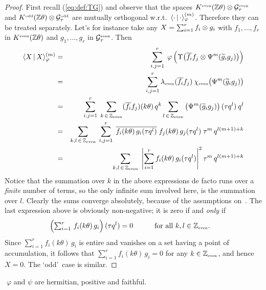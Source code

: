 \begin{proof}
First recall (\ref{eq:def:TG}) and observe that the spaces $K^{\rm \scriptscriptstyle even}(\mathbb{Z} \theta)\otimes \mathcal G_\tau^{\rm \scriptscriptstyle even}$
and $K^{\rm \scriptscriptstyle odd}(\mathbb{Z} \theta) \otimes \mathcal G_\tau^{\rm \scriptscriptstyle odd}$ are mutually orthogonal w.r.t.\ $\langle \cdot \,|\,\cdot \rangle_\varphi^{(m)}$.
Therefore they can be treated separately. Let's for instance take any
$X=\sum_{i=1}^r  f_i \otimes g_i$ with $f_1,\ldots, f_r$ in $K^{\rm \scriptscriptstyle even}(\mathbb{Z} \theta)$
and $g_1,\ldots, g_r$ in $\mathcal G_\tau^{\rm \scriptscriptstyle even}$. Then
\begin{eqnarray*}
  \skalphi{X}{X}{m} &=& \sum_{i,j=1}^r\;
           \varphi\left(\Upsilon \!\left(\overline{f_i}f_j
           \tens \Psi^m(\widetilde{g}_i g_j) \right) \vertL\!\right) \\
 &=& \sum_{i,j=1}^r \lameven(\overline{f_i}f_j)\:
             \chieven\!\left(\Psi^m(\widetilde{g}_i g_j)\vertM\right) \\
 &=& \sum_{i,j=1}^r \;\sum_{k \,\in \,\ZZeven}
       (\overline{f_i}f_j)(k\theta)\,q^k  \sum_{l \,\in \,\ZZeven}
       \left(\Psi^m(\widetilde{g}_i g_j)\vertM\right)(\tau q^l)\: q^l\\
 &=& \sum_{k,l \,\in\, \ZZeven} \; \sum_{i,j=1}^r \;
       \overline{f_i(k\theta)\,g_i(\tau q^l)}\; f_j(k\theta)\,
         g_j(\tau q^l)\; \tau^m\, q^{l(m+1)+k} \\
 &=& \sum_{k,l \,\in\, \ZZeven} \;
       \left| \sum_{i=1}^r f_i(k\theta)\,g_i(\tau q^l) \right|^2  \tau^m\,
       q^{l(m+1)+k}
\end{eqnarray*}
Notice that the summation over $k$ in the above expressions de
facto runs over a {\em finite\/} number of terms, so the only
infinite sum involved here, is the summation over $l$. Clearly
the sums converge absolutely, because of the assumptions \mbox{on \Gtau}\@.
The last expression above is obviously non-negative; it is zero
if and {\em only\/} if
\begin{equation}\label{eq:skalprod:definite}
  \left(\textstyle \sum_{i=1}^r \, f_i(k\theta)\,g_i \vertL\right)(\tau q^l)= 0
  \hspace{3em}\mbox{for all } k,l \in \ZZeven.
  \hspace{1em}
\end{equation}
Since $\sum_{i=1}^r f_i(k\theta)\,g_i$ is entire and
vanishes on a set having a point of accumulation, it follows that
$\sum_{i=1}^r f_i(k\theta)\,g_i=0$ for any $k\in\mathbb{Z}_{\rm \scriptscriptstyle even}$, and hence $X=0$.
The \lq odd\rq\ case is similar.
\end{proof}


\begin{prop} \label{prop:haar:Uq:positive}
$\;\varphi$ and\/ $\psi$ are hermitian, positive and faithful.
\end{prop}


